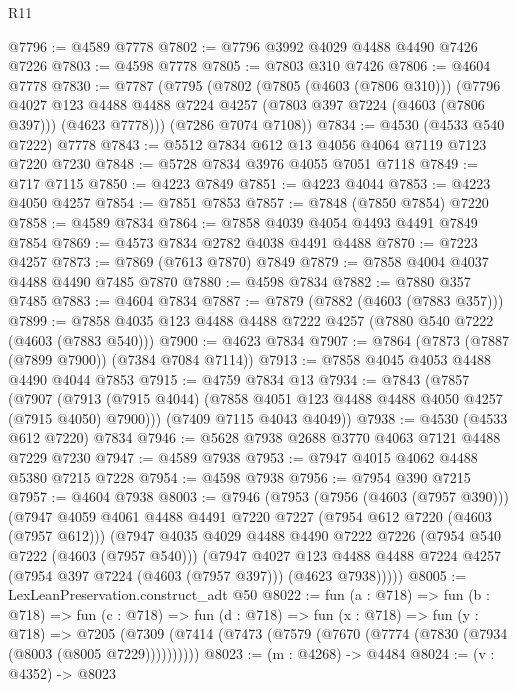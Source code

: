 \begin{lexlean}{R11}
\begin{coremodule}
@7796 := @4589 @7778
@7802 := @7796 @3992 @4029 @4488 @4490 @7426 @7226
@7803 := @4598 @7778
@7805 := @7803 @310 @7426
@7806 := @4604 @7778
@7830 := @7787
    (@7795
      (@7802
        (@7805 (@4603 (@7806 @310)))
        (@7796
          @4027
          @123
          @4488
          @4488
          @7224
          @4257
          (@7803 @397 @7224 (@4603 (@7806 @397)))
          (@4623 @7778)))
      (@7286 @7074 @7108))
@7834 := @4530 (@4533 @540 @7222) @7778
@7843 := @5512 @7834 @612 @13 @4056 @4064 @7119 @7123 @7220 @7230
@7848 := @5728 @7834 @3976 @4055 @7051 @7118
@7849 := @717 @7115
@7850 := @4223 @7849
@7851 := @4223 @4044
@7853 := @4223 @4050 @4257
@7854 := @7851 @7853
@7857 := @7848 (@7850 @7854) @7220
@7858 := @4589 @7834
@7864 := @7858 @4039 @4054 @4493 @4491 @7849 @7854
@7869 := @4573 @7834 @2782 @4038 @4491 @4488
@7870 := @7223 @4257
@7873 := @7869 (@7613 @7870) @7849
@7879 := @7858 @4004 @4037 @4488 @4490 @7485 @7870
@7880 := @4598 @7834
@7882 := @7880 @357 @7485
@7883 := @4604 @7834
@7887 := @7879 (@7882 (@4603 (@7883 @357)))
@7899 := @7858 @4035 @123 @4488 @4488 @7222 @4257 (@7880 @540 @7222 (@4603 (@7883 @540)))
@7900 := @4623 @7834
@7907 := @7864 (@7873 (@7887 (@7899 @7900)) (@7384 @7084 @7114))
@7913 := @7858 @4045 @4053 @4488 @4490 @4044 @7853
@7915 := @4759 @7834 @13
@7934 := @7843
    (@7857
      (@7907 (@7913 (@7915 @4044) (@7858 @4051 @123 @4488 @4488 @4050 @4257 (@7915 @4050) @7900)))
      (@7409 @7115 @4043 @4049))
@7938 := @4530 (@4533 @612 @7220) @7834
@7946 := @5628 @7938 @2688 @3770 @4063 @7121 @4488 @7229 @7230
@7947 := @4589 @7938
@7953 := @7947 @4015 @4062 @4488 @5380 @7215 @7228
@7954 := @4598 @7938
@7956 := @7954 @390 @7215
@7957 := @4604 @7938
@8003 := @7946
    (@7953
      (@7956 (@4603 (@7957 @390)))
      (@7947
        @4059
        @4061
        @4488
        @4491
        @7220
        @7227
        (@7954 @612 @7220 (@4603 (@7957 @612)))
        (@7947
          @4035
          @4029
          @4488
          @4490
          @7222
          @7226
          (@7954 @540 @7222 (@4603 (@7957 @540)))
          (@7947
            @4027
            @123
            @4488
            @4488
            @7224
            @4257
            (@7954 @397 @7224 (@4603 (@7957 @397)))
            (@4623 @7938)))))
@8005 := LexLeanPreservation.construct_adt @50
@8022 := fun (a : @718) =>
  fun (b : @718) =>
  fun (c : @718) =>
  fun (d : @718) =>
  fun (x : @718) =>
  fun (y : @718) =>
  @7205 (@7309 (@7414 (@7473 (@7579 (@7670 (@7774 (@7830 (@7934 (@8003 (@8005 @7229))))))))))
@8023 := (m : @4268) -> @4484
@8024 := (v : @4352) -> @8023

\end{coremodule}
\end{lexlean}
